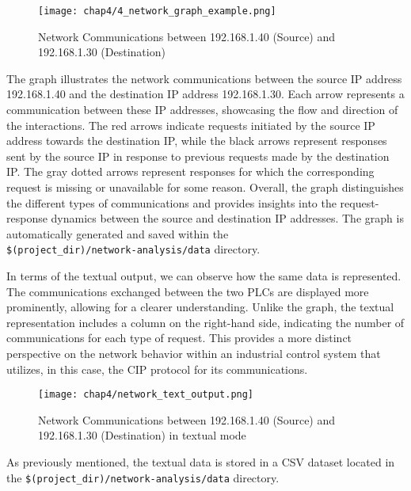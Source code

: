 \begin{figure}[ht]
	\centering
	\texttt{[image: chap4/4\_network\_graph\_example.png]}
	\caption{Network Communications between 192.168.1.40 (Source) and 192.168.1.30 (Destination)}
	\label{fig:4_network_graph_example}
\end{figure}

The graph illustrates the network communications between the source IP address 192.168.1.40 and the destination IP address 192.168.1.30. Each arrow represents a communication between these IP addresses, showcasing the flow and direction of the interactions. The red arrows indicate requests initiated by the source IP address towards the destination IP, while the black arrows represent responses sent by the source IP in response to previous requests made by the destination IP. The gray dotted arrows represent responses for which the corresponding request is missing or unavailable for some reason. Overall, the graph distinguishes the different types of communications and provides insights into the request-response dynamics between the source and destination IP addresses. The graph is automatically generated and saved within the\\ 
\texttt{\$(project\_dir)/network-analysis/data} directory.

\bigskip
In terms of the textual output, we can observe how the same data is represented. The communications exchanged between the two PLCs are displayed more prominently, allowing for a clearer understanding. Unlike the graph, the textual representation includes a column on the right-hand side, indicating the number of communications for each type of request. This provides a more distinct perspective on the network behavior within an industrial control system that utilizes, in this case, the CIP protocol for its communications.

\begin{figure}[ht]
	\centering
	\texttt{[image: chap4/network\_text\_output.png]}
	\caption{Network Communications between 192.168.1.40 (Source) and 192.168.1.30 (Destination) in textual mode}
	\label{fig:4_network_textual_example}
\end{figure}

As previously mentioned, the textual data is stored in a CSV dataset located in the \texttt{\$(project\_dir)/network-analysis/data} directory.


\vfill
\nolinenumbers